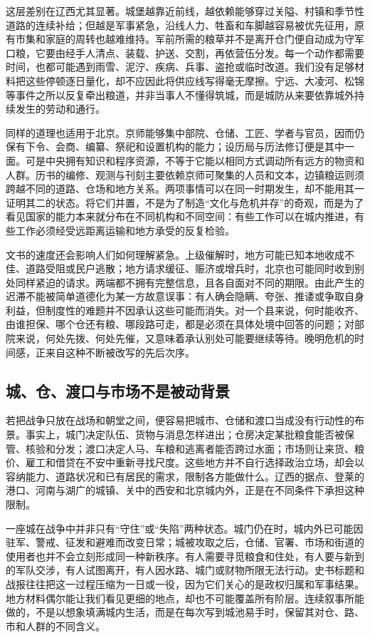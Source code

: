 这层差别在辽西尤其显著。城堡越靠近前线，越依赖能够穿过关隘、村镇和季节性道路的连续补给；但越是军事紧急，沿线人力、牲畜和车脚越容易被优先征用，原有市集和家庭的周转也越难维持。军前所需的粮草并不是离开仓门便自动成为守军口粮，它要由经手人清点、装载、护送、交割，再依营伍分发。每一个动作都需要时间，也都可能遇到雨雪、泥泞、疾病、兵事、盗抢或临时改道。我们没有足够材料把这些停顿逐日量化，却不应因此将供应线写得毫无摩擦。宁远、大凌河、松锦等事件之所以反复牵出粮道，并非当事人不懂得筑城，而是城防从来要依靠城外持续发生的劳动和通行。

同样的道理也适用于北京。京师能够集中部院、仓储、工匠、学者与官员，因而仍保有下令、会商、编纂、祭祀和设置机构的能力；设历局与历法修订便是其中一面。可是中央拥有知识和程序资源，不等于它能以相同方式调动所有远方的物资和人群。历书的编修、观测与刊刻主要依赖京师可聚集的人员和文本，边镇粮运则须跨越不同的道路、仓场和地方关系。两项事情可以在同一时期发生，却不能用其一证明其二的状态。将它们并置，不是为了制造“文化与危机并存”的奇观，而是为了看见国家的能力本来就分布在不同机构和不同空间：有些工作可以在城内推进，有些工作必须经受远距离运输和地方承受的反复检验。

文书的速度还会影响人们如何理解紧急。上级催解时，地方可能已知本地收成不佳、道路受阻或民户逃散；地方请求缓征、赈济或增兵时，北京也可能同时收到别处同样紧迫的请求。两端都不拥有完整信息，且各自面对不同的期限。由此产生的迟滞不能被简单道德化为某一方故意误事：有人确会隐瞒、夸张、推诿或争取自身利益，但制度性的难题并不因承认这些可能而消失。对一个县来说，何时能收齐、由谁担保、哪个仓还有粮、哪段路可走，都是必须在具体处境中回答的问题；对部院来说，何处先拨、何处先催，又意味着承认别处可能要继续等待。晚明危机的时间感，正来自这种不断被改写的先后次序。

\subsection{城、仓、渡口与市场不是被动背景}

若把战争只放在战场和朝堂之间，便容易把城市、仓储和渡口当成没有行动性的布景。事实上，城门决定队伍、货物与消息怎样进出；仓房决定某批粮食能否被保管、核验和分发；渡口决定人马、车粮和逃离者能否跨过水面；市场则让来货、粮价、雇工和借贷在不安中重新寻找尺度。这些地方并不自行选择政治立场，却会以容纳能力、道路状况和已有居民的需求，限制各方能做什么。辽西的据点、登莱的港口、河南与湖广的城镇、关中的西安和北京城内外，正是在不同条件下承担这种限制。

一座城在战争中并非只有“守住”或“失陷”两种状态。城门仍在时，城内外已可能因驻军、警戒、征发和避难而改变日常；城被攻取之后，仓储、官署、市场和街道的使用者也并不会立刻形成同一种新秩序。有人需要寻觅粮食和住处，有人要与新到的军队交涉，有人试图离开，有人因水路、城门或财物所限无法行动。史书标题和战报往往把这一过程压缩为一日或一役，因为它们关心的是政权归属和军事结果。地方材料偶尔能让我们看见更细的地点，却也不可能覆盖所有阶层。连续叙事所能做的，不是以想象填满城内生活，而是在每次写到城池易手时，保留其对仓、路、市和人群的不同含义。

